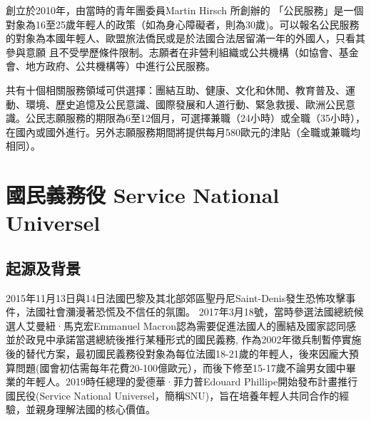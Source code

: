 \documentclass[a4paper,14pt]{extarticle}
\theoremstyle{plain}
\theoremstyle{remark}
\numberwithin{equation}{section}
\begin{document}
創立於2010年，由當時的青年團委員Martin Hirsch 所創辦的 「公民服務」是一個對象為16至25歲年輕人的政策（如為身心障礙者，則為30歲)。可以報名公民服務的對象為本國年輕人、歐盟旅法僑民或是於法國合法居留滿一年的外國人，只看其參與意願
且不受學歷條件限制。志願者在非營利組織或公共機構（如協會、基金會、地方政府、公共機構等）中進行公民服務。

共有十個相關服務領域可供選擇：團結互助、健康、文化和休閒、教育普及、運動、環境、歷史追憶及公民意識、國際發展和人道行動、緊急救援、歐洲公民意識。公民志願服務的期限為6至12個月，可選擇兼職（24小時）或全職（35小時），在國內或國外進行。另外志願服務期間將提供每月580歐元的津貼（全職或兼職均相同）。


%
%
%


\newpage 

\section{國民義務役 Service National Universel}


\subsection{起源及背景}
2015年11月13日與14日法國巴黎及其北部郊區聖丹尼Saint-Denis發生恐怖攻擊事件，法國社會瀰漫著恐慌及不信任的氛圍。
2017年3月18號，當時參選法國總統候選人艾曼紐·馬克宏Emmanuel Macron認為需要促進法國人的團結及國家認同感\cite{service_militaire_parisien_2018}並於政見中承諾當選總統後推行某種形式的國民義務, 作為2002年徵兵制暫停實施後的替代方案，最初國民義務役對象為每位法國18-21歲的年輕人，後來因龐大預算問題(國會初估需每年花費20-100億歐元\cite{snu_franceinfo_budget}），而後下修至15-17歲不論男女國中畢業的年輕人。2019時任總理的愛德華·菲力普Edouard Phillipe開始發布計畫推行國民役(Service National Universel，簡稱SNU)，旨在培養年輕人共同合作的經驗，並親身理解法國的核心價值。
\end{document}
